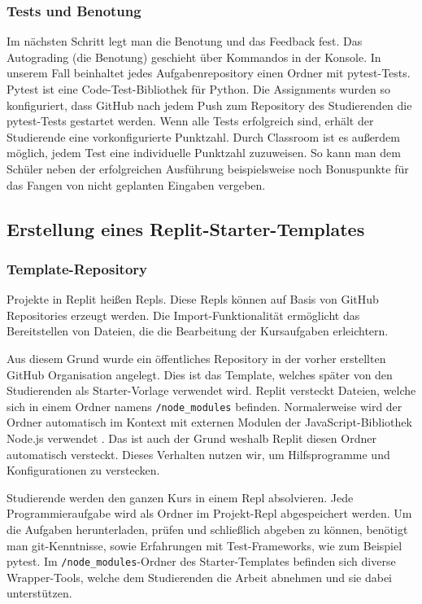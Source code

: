 \subsubsection{Tests und Benotung}\label{classroom-tests}
Im nächsten Schritt legt man die Benotung und das Feedback fest. Das Autograding
(die Benotung) geschieht über Kommandos in der Konsole. In unserem Fall
beinhaltet jedes Aufgabenrepository einen Ordner mit pytest-Tests. Pytest ist
eine Code-Test-Bibliothek für Python. Die Assignments wurden so konfiguriert,
dass GitHub nach jedem Push zum Repository des Studierenden die pytest-Tests
gestartet werden. Wenn alle Tests erfolgreich sind, erhält der Studierende eine
vorkonfigurierte Punktzahl. Durch Classroom ist es außerdem möglich, jedem
Test eine individuelle Punktzahl zuzuweisen. So kann man dem Schüler neben der erfolgreichen Ausführung beispielsweise noch Bonuspunkte für das Fangen von
nicht geplanten Eingaben vergeben. \parencite{github-assignment-erstellen}

\subsection{Erstellung eines Replit-Starter-Templates}\label{replit-template}
\subsubsection{Template-Repository}\label{replit-template-repository}
Projekte in Replit heißen Repls. Diese Repls können auf Basis von GitHub
Repositories erzeugt werden. Die Import-Funktionalität ermöglicht das
Bereitstellen von Dateien, die die Bearbeitung der Kursaufgaben erleichtern.

Aus diesem Grund wurde ein öffentliches Repository in der vorher erstellten
GitHub Organisation angelegt. Dies ist das Template, welches später von den
Studierenden als Starter-Vorlage verwendet wird. Replit versteckt Dateien,
welche sich in einem Ordner namens \texttt{/node\_modules} befinden.
Normalerweise wird der Ordner automatisch im Kontext mit externen Modulen der
JavaScript-Bibliothek Node.js verwendet \parencite{nodejs}. Das ist auch der Grund
weshalb Replit diesen Ordner automatisch versteckt. Dieses Verhalten nutzen wir,
um Hilfsprogramme und Konfigurationen zu verstecken.

Studierende werden den ganzen Kurs in einem Repl absolvieren. Jede
Programmieraufgabe wird als Ordner im Projekt-Repl abgespeichert werden. Um die
Aufgaben herunterladen, prüfen und schließlich abgeben zu können, benötigt
man git-Kenntnisse, sowie Erfahrungen mit Test-Frameworks, wie zum Beispiel 
pytest. Im \texttt{/node\_modules}-Ordner des Starter-Templates befinden sich
diverse Wrapper-Tools, welche dem Studierenden die Arbeit abnehmen und sie dabei
unterstützen.

